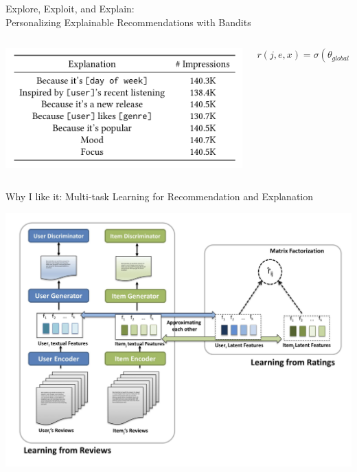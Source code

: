 \documentclass[11pt,aspectratio=169]{beamer}
\begin{document}
\begin{frame}{Explore, Exploit, and Explain: \\ Personalizing Explainable Recommendations with Bandits \cite{EX3}}

\begin{columns}
\begin{column}{0.4\textwidth}
\begin{center}
\includegraphics[scale=0.4]{images/spotify.png}
\end{center}
\end{column}

\begin{column}{0.5\textwidth}
\[
r(j, e, x) = \sigma(\theta_{global} + \theta_{j} \times 1_j + \theta_e \times 1_e + \theta_x \times 1_x)
\]
\end{column}
\end{columns}

\end{frame}

\begin{frame}{Why I like it: Multi-task Learning for Recommendation and Explanation \cite{GAN}}

\begin{center}
\includegraphics[scale=0.4]{images/gan.png}
\end{center}

\end{frame}
\end{document}
